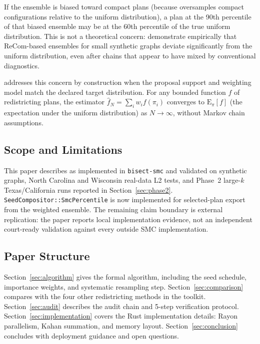 If the ensemble is biased toward compact plans (because \recom{} oversamples
compact configurations relative to the uniform distribution), a plan at the
90th percentile of that biased ensemble may be at the 60th percentile of the
true uniform distribution.
This is not a theoretical concern: \citet{fifield2020} demonstrate empirically
that ReCom-based ensembles for small synthetic graphs deviate significantly from
the uniform distribution, even after chains that appear to have mixed by
conventional diagnostics.

\smc{} addresses this concern by construction when the proposal support and
weighting model match the declared target distribution.
For any bounded function $f$ of redistricting plans, the \smc{} estimator
$\hat{f}_N = \sum_i w_i f(\pi_i)$ converges to
$\mathrm{E}_\pi[f]$ (the expectation under the uniform distribution) as $N \to
\infty$, without Markov chain assumptions.

\subsection{Scope and Limitations}

This paper describes \smc{} as implemented in \texttt{bisect-smc} and
validated on synthetic graphs, North Carolina and Wisconsin real-data L2 tests,
and Phase~2 large-$k$ Texas/California runs reported in
Section~\ref{sec:phase2}. \texttt{SeedCompositor::SmcPercentile} is now
implemented for selected-plan export from the weighted ensemble. The remaining
claim boundary is external replication: the paper reports local implementation
evidence, not an independent court-ready validation against every outside SMC
implementation.

\subsection{Paper Structure}

Section~\ref{sec:algorithm} gives the formal \smc{} algorithm, including the
seed schedule, importance weights, and systematic resampling step.
Section~\ref{sec:comparison} compares \smc{} with the four other redistricting
methods in the toolkit.
Section~\ref{sec:audit} describes the audit chain and 5-step verification
protocol.
Section~\ref{sec:implementation} covers the Rust implementation details:
Rayon parallelism, Kahan summation, and memory layout.
Section~\ref{sec:conclusion} concludes with deployment guidance and open
questions.
